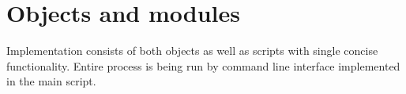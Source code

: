 \documentclass[12pt, a4paper, oneside]{book}
\begin{document}


\section{Objects and modules}

Implementation consists of both objects as well as scripts with single concise functionality.
Entire process is being run by command line interface implemented in the main script.
\end{document}
